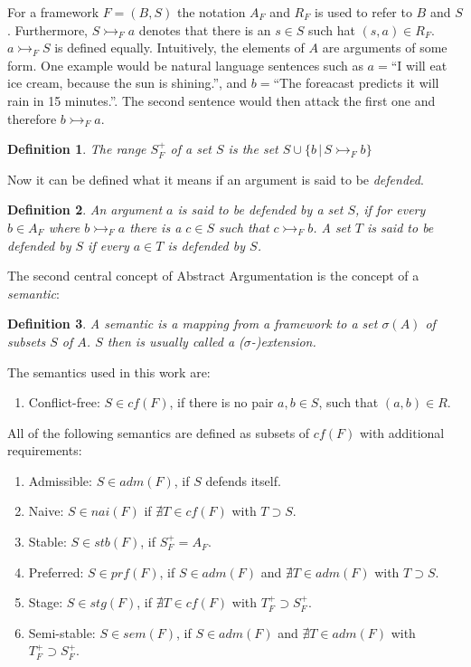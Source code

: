 \documentclass[parskip=half]{scrartcl}
\newtheorem{definition}{Definition}
\begin{document}
For a framework $F = (B, S)$ the notation $A_F$ and $R_F$ is
used to refer to $B$ and $S$. Furthermore, $S \rightarrowtail_F a$ denotes that
there is an $s \in S$ such hat $(s, a) \in R_F$. $a \rightarrowtail_F S$ is
defined equally. Intuitively, the elements of $A$ are arguments of some form.
One example would be natural language sentences such as $a=$``I will eat ice
cream, because the sun is shining.'', and $b=$``The foreacast predicts it will
rain in 15 minutes.''. The second sentence would then attack the first one and
therefore $b \rightarrowtail_F a$.
\begin{definition}
The \emph{range} $S_F^{+}$ of a set $S$ is the
set $S \cup\{b\,|\,S \rightarrowtail_F b\}$
\end{definition}

Now it can be defined what it means if an argument is said to be
\emph{defended}.
\begin{definition}
An argument $a$ is said to be \emph{defended} by a set $S$, if for every $b \in
A_F$ where $b \rightarrowtail_F a$ there is a $c \in S$ such that $c
\rightarrowtail_F b$. A set $T$ is said to be \emph{defended} by $S$ if every
$a \in T$ is defended by $S$.
\end{definition}

The second central concept of Abstract Argumentation is the concept of
a \emph{semantic}:
\begin{definition}
A \emph{semantic} is a mapping from a framework to a set $\sigma(A)$ of subsets
$S$ of $A$.  $S$ then is usually called a ($\sigma$-)extension.
\end{definition}

The semantics used in this work are:
\begin{enumerate}
  \item Conflict-free: $S \in cf(F)$, if there is no pair $a,b \in S$, such that
      $(a,b) \in R$.
\end{enumerate}
All of the following semantics are defined as subsets of $cf(F)$
with additional requirements:
\begin{enumerate}[resume]
  \item Admissible: $S \in adm(F)$, if $S$ defends itself.
  \item Naive: $S \in nai(F)$ if $\nexists T\in cf(F)$ with $T \supset S$.
  \item Stable: $S \in stb(F)$, if $S_F^{+} = A_F$.
  \item Preferred: $S \in prf(F)$, if $S \in adm(F)$ and $\nexists T\in adm(F)$
      with $T \supset S$.
  \item Stage: $S \in stg(F)$, if $\nexists T\in cf(F)$ with $T_F^{+} \supset
      S_F^{+}$.
  \item Semi-stable: $S \in sem(F)$, if $S \in adm(F)$ and $\nexists T\in
      adm(F)$ with $T_F^{+} \supset S_F^{+}$.
\end{enumerate}
\end{document}
